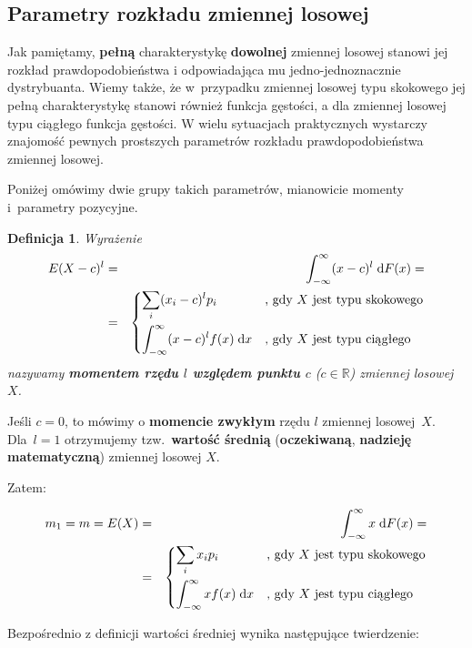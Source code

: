 \documentclass[10pt,a4paper]{article}
\newtheorem{definition}{Definicja}[section]
\newcommand{\dd}{\; \mathrm{d}}
\numberwithin{equation}{subsection}
\begin{document}
\subsection{Parametry rozkładu zmiennej losowej}
Jak pamiętamy, \textbf{pełną} charakterystykę \textbf{dowolnej} zmiennej losowej
stanowi jej rozkład prawdopodobieństwa i odpowiadająca mu jedno-jednoznacznie
dystrybuanta. Wiemy także, że w~przypadku zmiennej losowej typu skokowego jej
pełną charakterystykę stanowi również funkcja gęstości, a dla zmiennej losowej
typu ciągłego funkcja gęstości.  W wielu sytuacjach praktycznych wystarczy
znajomość pewnych prostszych parametrów rozkładu prawdopodobieństwa zmiennej
losowej.

Poniżej omówimy dwie grupy takich parametrów, mianowicie momenty i~parametry
pozycyjne.

\begin{definition}
  Wyrażenie
  \begin{eqnarray}
    E(X-c)^l &= & \int_{-\infty}^{\infty}(x-c)^l\dd{F(x)} = \\
    \nonumber
    &= & \begin{dcases}
      \sum_i(x_i-c)^lp_i & \textrm{, gdy $X$ jest typu skokowego} \\
      \int_{-\infty}^{\infty}(x-c)^lf(x)\dd{x} & \textrm{, gdy $X$ jest typu ciągłego}
    \end{dcases}
  \end{eqnarray}
  nazywamy \textbf{momentem rzędu $l$ względem punktu $c$} ($c \in \mathbb{R}$)
  zmiennej losowej $X$.
\end{definition}

Jeśli $c=0$, to mówimy o \textbf{momencie zwykłym} rzędu $l$ zmiennej
losowej~$X$. Dla~$l=1$ otrzymujemy tzw.~\textbf{wartość średnią}
(\textbf{oczekiwaną}, \textbf{nadzieję matematyczną}) zmiennej losowej $X$.

Zatem:

\begin{eqnarray}
  m_1 = m = E(X) & = & \int_{-\infty}^{\infty}x\dd{F(x)} = \\
  \nonumber
  & = & \begin{dcases}
    \sum_ix_ip_i & \textrm{, gdy $X$ jest typu skokowego}\\
    \int_{-\infty}^{\infty}xf(x)\dd{x} & \textrm{, gdy $X$ jest typu ciągłego}
  \end{dcases}
\end{eqnarray}

Bezpośrednio z definicji wartości średniej wynika następujące twierdzenie:
\end{document}
